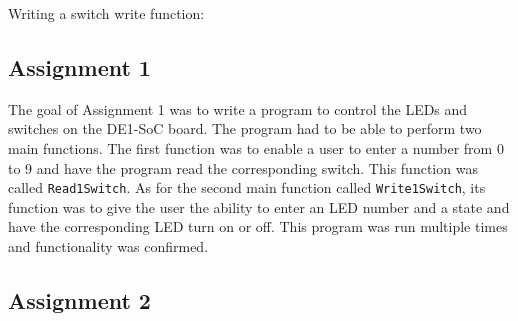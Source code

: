\documentclass[
	letterpaper, %
	10pt, %
]{CSUniSchoolLabReport}
\begin{document}
   

\item Writing a switch write function:

 


\subsection{Assignment 1}

The goal of Assignment 1 was to write a program to control the LEDs and switches on the DE1-SoC board. The program had to be able to perform two main functions. The first function was to enable a user to enter a number from 0 to 9 and have the program read the corresponding switch. This function was called \texttt{Read1Switch}. As for the second main function called \texttt{Write1Switch}, its function was to give the user the ability to enter an LED number and a state and have the corresponding LED turn on or off. This program was run multiple times and functionality was confirmed.

\subsection{Assignment 2}
\end{document}
